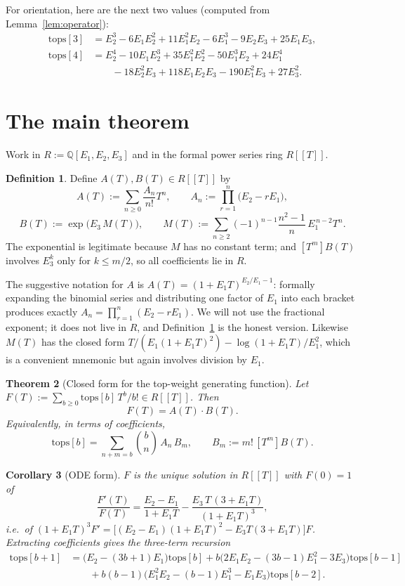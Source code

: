 \documentclass[10pt]{article}
\theoremstyle{plain}
\newtheorem{theorem}{Theorem}[section]
\newtheorem{corollary}[theorem]{Corollary}
\theoremstyle{definition}
\newtheorem{definition}[theorem]{Definition}
\newcommand{\bbQ}{\mathbb{Q}}
\begin{document}
For orientation, here are the next two values (computed from Lemma~\ref{lem:operator}):
\begin{align*}
 \mathrm{tops}[3]&=E_2^3-6E_1E_2^2+11E_1^2E_2-6E_1^3-9E_2E_3+25E_1E_3,\\
 \mathrm{tops}[4]&=E_2^4-10E_1E_2^3+35E_1^2E_2^2-50E_1^3E_2+24E_1^4\\
  &\qquad -18E_2^2E_3+118E_1E_2E_3-190E_1^2E_3+27E_3^2 .
\end{align*}

\section{The main theorem}\label{sec:main}

Work in $R:=\bbQ[E_1,E_2,E_3]$ and in the formal power series ring $R[[T]]$.

\begin{definition}\label{def:AB}
Define $A(T),B(T)\in R[[T]]$ by
\[
 A(T):=\sum_{n\ge0}\frac{A_n}{n!}T^n,\qquad A_n:=\prod_{r=1}^{n}\big(E_2-rE_1\big),
\]
\[
 B(T):=\exp\!\big(E_3\,M(T)\big),\qquad
 M(T):=\sum_{n\ge2}(-1)^{n-1}\frac{n^2-1}{n}\,E_1^{\,n-2}T^n .
\]
The exponential is legitimate because $M$ has no constant term; and $[T^m]B(T)$ involves
$E_3^k$ only for $k\le m/2$, so all coefficients lie in $R$.
\end{definition}

The suggestive notation for $A$ is $A(T)=(1+E_1T)^{E_2/E_1-1}$: formally expanding the
binomial series and distributing one factor of $E_1$ into each bracket produces exactly
$A_n=\prod_{r=1}^n(E_2-rE_1)$. We will not use the fractional exponent; it does not live in
$R$, and Definition~\ref{def:AB} is the honest version. Likewise $M(T)$ has the closed form
$T/(E_1(1+E_1T)^2)-\log(1+E_1T)/E_1^2$, which is a convenient mnemonic but again involves
division by $E_1$.

\begin{theorem}[Closed form for the top-weight generating function]\label{thm:main}
Let $F(T):=\sum_{b\ge0}\mathrm{tops}[b]\,T^b/b!\in R[[T]]$. Then
\[
  \boxed{\ F(T)=A(T)\cdot B(T).\ }
\]
Equivalently, in terms of coefficients,
\begin{equation}\label{eq:coeff}
 \mathrm{tops}[b]=\sum_{n+m=b}\binom{b}{n}\,A_n\,B_m,\qquad B_m:=m!\,[T^m]B(T).
\end{equation}
\end{theorem}

\begin{corollary}[ODE form]\label{cor:ode}
$F$ is the unique solution in $R[[T]]$ with $F(0)=1$ of
\[
 \frac{F'(T)}{F(T)}=\frac{E_2-E_1}{1+E_1T}-\frac{E_3\,T\,(3+E_1T)}{(1+E_1T)^3},
\]
i.e.\ of $(1+E_1T)^3F'=\big[(E_2-E_1)(1+E_1T)^2-E_3T(3+E_1T)\big]F$. Extracting
coefficients gives the three-term recursion
\begin{align*}
 \mathrm{tops}[b+1]&=\big(E_2-(3b+1)E_1\big)\mathrm{tops}[b]
  +b\big(2E_1E_2-(3b-1)E_1^2-3E_3\big)\mathrm{tops}[b-1]\\
 &\qquad + b(b-1)\big(E_1^2E_2-(b-1)E_1^3-E_1E_3\big)\mathrm{tops}[b-2].
\end{align*}
\end{corollary}
\end{document}
